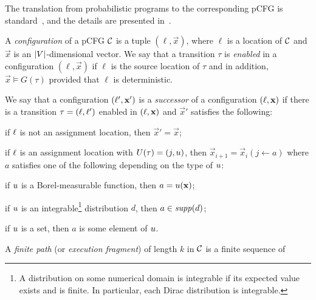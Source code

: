 The translation from probabilistic programs to the corresponding pCFG is 
standard~\cite{CFNH16:prob-termination}, and the details are presented 
in~\AppendixMaterial.

\smallskip{}
A \emph{configuration} of a pCFG $\mathcal{C}$ is a tuple $(\ell,\vec{x})$,
where $\ell$ is a location of $\mathcal{C}$ and $\vec{x}$ is an 
$|V|$-dimensional vector.
We say that a transition $\tau$ is \emph{enabled} in a configuration
$(\ell,\vec{x})$ if $\ell$ is the source location of $\tau$ and in addition,
${\vec{x}}\models G(\tau)$ provided that $\ell$ is deterministic. 

\smallskip{}
We say that a configuration $(\ell',\mathbf{x}')$ is a \emph{successor} of a 
configuration $(\ell,\mathbf{x})$ if 
there is a transition  $\tau=(\ell,\ell')$ enabled in
$(\ell,\mathbf{x})$ 
and $\vec{x}'$ satisfies the following:
\begin{compactitem}
\item if $\ell$ is not an assignment location, then $\vec{x}'=\vec{x}$;
\item if $\ell$ is an assignment location with $U(\tau)=(j,u)$, then 
$\vec{x}_{i+1}=\vec{x}_i(j\leftarrow a)$ where $a$ satisfies one of the 
following 
depending on the type of $u$:
\begin{compactitem}
\item if $u$ is a Borel-measurable function, then $a=u(\mathbf{x})$;
\item if $u$ is an integrable\footnote{A distribution on some numerical 
domain 
is integrable if its expected value exists and is finite. In particular, each 
Dirac distribution is integrable.} distribution $d$, then 
$a\in \mathit{supp}(d)$;
\item if $u$ is a set, then $a$ is some element of $u$.
\end{compactitem}
\end{compactitem}
A \emph{finite path} (or
\emph{execution fragment}) of length $k$ in $\mathcal{C}$ is a finite sequence of
